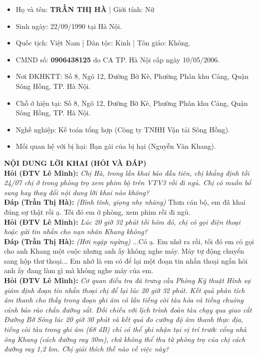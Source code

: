\documentclass[12pt,a4paper]{article}
\begin{document}
\begin{itemize}[leftmargin=*, itemsep=2pt, topsep=2pt, parsep=0pt]
  \item Họ và tên: \textbf{TRẦN THỊ HÀ} | Giới tính: Nữ
  \item Sinh ngày: 22/09/1990 tại Hà Nội.
  \item Quốc tịch: Việt Nam | Dân tộc: Kinh | Tôn giáo: Không.
  \item CMND số: \textbf{0906438125} do CA TP. Hà Nội cấp ngày 10/05/2006.
  \item Nơi ĐKHKTT: Số 8, Ngõ 12, Đường Bờ Kè, Phường Phân khu Cảng, Quận Sông Hồng, TP. Hà Nội.
  \item Chỗ ở hiện tại: Số 8, Ngõ 12, Đường Bờ Kè, Phường Phân khu Cảng, Quận Sông Hồng, TP. Hà Nội.
  \item Nghề nghiệp: Kế toán tổng hợp (Công ty TNHH Vận tải Sông Hồng).
  \item Mối quan hệ với bị hại: Bạn gái của bị hại (Nguyễn Văn Khang).


\end{itemize}

\vspace{0.3cm}\noindent\textbf{\large NỘI DUNG LỜI KHAI (HỎI VÀ ĐÁP)}\\[0.15cm]


\noindent\textbf{Hỏi (ĐTV Lê Minh):} \textit{Chị Hà, trong lần khai báo đầu tiên, chị khẳng định tối 24/07 chị ở trong phòng trọ xem phim bộ trên VTV3 rồi đi ngủ. Chị có muốn bổ sung hay thay đổi nội dung lời khai nào không?}\\[0.15cm]

\noindent\textbf{Đáp (Trần Thị Hà):} \textit{(Bình tĩnh, giọng nhẹ nhàng)} Thưa cán bộ, em đã khai đúng sự thật rồi ạ. Tối đó em ở phòng, xem phim rồi đi ngủ.\\[0.35cm]


\noindent\textbf{Hỏi (ĐTV Lê Minh):} \textit{Lúc 20 giờ 32 phút tối hôm đó, chị có gọi điện thoại hoặc gửi tin nhắn cho nạn nhân Khang không?}\\[0.15cm]

\noindent\textbf{Đáp (Trần Thị Hà):} \textit{(Hơi ngập ngừng)} ...Có ạ. Em nhớ ra rồi, tối đó em có gọi cho anh Khang một cuộc nhưng anh ấy không nghe máy. Máy tự động chuyển sang hộp thư thoại... Em nhớ là em có để lại một đoạn tin nhắn thoại ngắn hỏi anh ấy đang làm gì mà không nghe máy của em.\\[0.35cm]


\noindent\textbf{Hỏi (ĐTV Lê Minh):} \textit{Cơ quan điều tra đã trưng cầu Phòng Kỹ thuật Hình sự giám định đoạn tin nhắn thoại chị để lại lúc 20 giờ 32 phút. Kết quả phân tích âm thanh cho thấy trong đoạn ghi âm có lẫn tiếng còi tàu hỏa và tiếng chuông cảnh báo rào chắn đường sắt. Đối chiếu với lịch trình đoàn tàu chạy qua giao cắt Đường Bờ Sông lúc 20 giờ 30 phút và kết quả đo cường độ âm thanh thực địa, tiếng còi tàu trong ghi âm (68 dB) chỉ có thể ghi nhận tại vị trí trước cổng nhà ông Khang (cách đường ray 30m), chứ không thể thu từ phòng trọ của chị cách đường ray 1,2 km. Chị giải thích thế nào về việc này?}\\[0.15cm]
\end{document}
